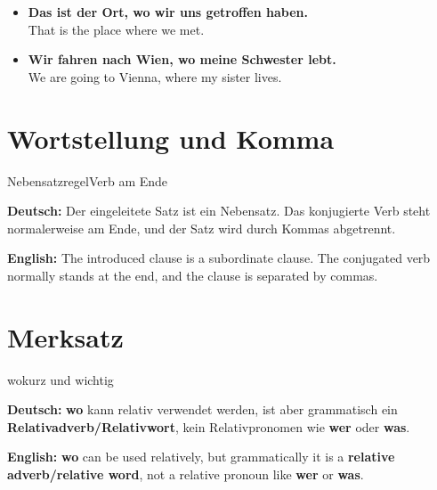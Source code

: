 \documentclass[a4paper,11pt]{article}
\newcommand{\GermanText}[1]{\textbf{Deutsch: }#1\par}
\newcommand{\EnglishText}[1]{{\small\color{SoftGray}\textbf{English: }#1\par}}
\newcommand{\ExampleItem}[2]{\item \textbf{#1}\\{\small\color{SoftGray}#2}}
\begin{document}
\begin{exbox}

\begin{itemize}

\ExampleItem{Das ist der Ort, wo wir uns getroffen haben.}{That is the place where we met.}

\ExampleItem{Wir fahren nach Wien, wo meine Schwester lebt.}{We are going to Vienna, where my sister lives.}

\end{itemize}

\end{exbox}

\section{Wortstellung und Komma}

\begin{grammarentry}{Nebensatzregel}{Verb am Ende}

\GermanText{Der eingeleitete Satz ist ein Nebensatz. Das konjugierte Verb steht normalerweise am Ende, und der Satz wird durch Kommas abgetrennt.}

\EnglishText{The introduced clause is a subordinate clause. The conjugated verb normally stands at the end, and the clause is separated by commas.}

\end{grammarentry}

\section{Merksatz}

\begin{grammarentry}{wo}{kurz und wichtig}

\GermanText{\textbf{wo} kann relativ verwendet werden, ist aber grammatisch ein \textbf{Relativadverb/Relativwort}, kein Relativpronomen wie \textbf{wer} oder \textbf{was}.}

\EnglishText{\textbf{wo} can be used relatively, but grammatically it is a \textbf{relative adverb/relative word}, not a relative pronoun like \textbf{wer} or \textbf{was}.}

\end{grammarentry}
\end{document}
